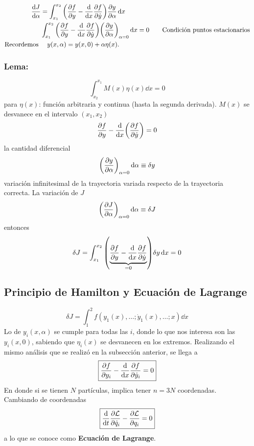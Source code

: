 \begin{align*}
	\dv{J}{\alpha} &= \int _{x_1} ^{x_2} \qty(\pdv{f}{y} - \dv{x} \pdv{f}{\dot{y}}) \pdv{y}{\alpha} \dd{x} \\
	&\int _{x_1} ^{x_2} \qty(\pdv{f}{y} - \dv{x} \pdv{f}{\dot{y}}) \qty(\pdv{y}{\alpha})_{\alpha = 0} \dd{x} = 0 \qquad \text{Condición puntos estacionarios} \\
	\text{Recordemos } &\quad y(x,\alpha) = y(x,0) + \alpha \eta (x).
\end{align*}

\subsubsection{Lema: }
\begin{equation}
	\int _{x_2} ^{x_1} M(x) \eta (x) \dd{x} = 0
\end{equation}
para $\eta (x)$: función arbitraria y continua (hasta la segunda derivada). $M(x)$ se desvanece en el intervalo $(x_1,x_2)$
\begin{equation}
	\pdv{f}{y} - \dv{x} \qty(\pdv{f}{\dot{y}}) = 0
\end{equation}
la cantidad diferencial
	\begin{equation}
		\qty(\pdv{y}{\alpha})_{\alpha = 0} \dd{\alpha} \equiv \delta y
	\end{equation}
variación infinitesimal de la trayectoria variada respecto de la trayectoria correcta. La variación de $J$
\begin{equation}
	\qty(\pdv{J}{\alpha})_{\alpha = 0} \dd{\alpha} \equiv \delta J
\end{equation}
entonces
\begin{equation}
	\delta J = \int _{x_1} ^{x_2} \qty(\underbrace{\pdv{f}{y} - \dv{x} \pdv{f}{\dot{y}}}_{=0}) \delta y \dd{x} = 0
\end{equation}

\subsection{Principio de Hamilton y Ecuación de Lagrange}
\begin{equation}
	\delta J = \int _1 ^2 f(y_1 (x), \ldots; \dot{y} _1 (x), \ldots; x) \dd{x}
\end{equation}
Lo de $y_i(x,\alpha)$ se cumple para todas las $i$, donde lo que nos interesa son las $y_i (x,0)$, sabiendo que $\eta _i (x)$ se desvanecen en los extremos. Realizando el mismo análisis que se realizó en la subsección anterior, se llega a 
	\begin{equation}
		\boxed{ \pdv{f}{y_i} - \dv{x} \pdv{f}{\dot{y}_i} = 0 }
	\end{equation}
En donde si se tienen $N$ partículas, implica tener $n = 3N$ coordenadas. Cambiando de coordenadas
\begin{equation}
	\boxed{ \dv{t} \pdv{\mathcal{L}}{\dot{q}_i } - \pdv{\mathcal{L}}{q_i} = 0 }
\end{equation}
a lo que se conoce como \textbf{Ecuación de Lagrange}.

